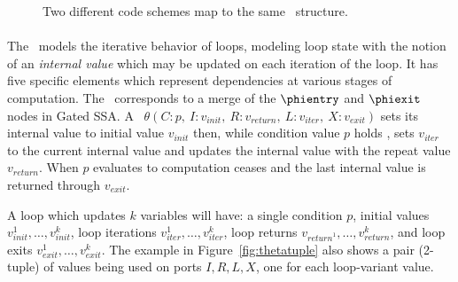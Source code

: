{\begin{figure}[!hb]
\centering
{}
\caption{Two different code schemes map to the same \Gn\ structure.}

\label{fig:twinPhis}
\end{figure}


\paragraph{\Tns}
The \Tn\ models the iterative behavior of loops, modeling loop state with the notion of an \emph{internal value} which may be updated on each iteration of the loop. 
It has five specific elements which represent dependencies at various stages of computation. 
The \Tn\ corresponds to a merge of the $\phientry$ and $\phiexit$ nodes in Gated SSA.
%
A \Tn\ $\theta(C:p,\ I:v_\textit{init},\ R:v_\textit{return},\ L: v_\textit{iter},\ X:v_{exit})$ sets its internal value to initial value $v_\textit{init}$ then, while condition value $p$ holds \true, sets $v_\textit{iter}$ to the current internal value and updates the internal value with the repeat value $v_\textit{return}$. 
When $p$ evaluates to \false computation ceases and the last internal value is returned through $v_\textit{exit}$.

%
A loop which updates $k$ variables will have: 
a single condition $p$, initial values $v_{\textit{init}}^1,\ldots,v_{\textit{init}}^k$, loop iterations $v_{\textit{iter}}^1,\ldots,v_{\textit{iter}}^k$, loop returns $v_{\textit{return}^1},\ldots,v_{\textit{return}}^k$, and loop exits $v_{\textit{exit}}^1,\ldots,v_{\textit{exit}}^k$.
The example in Figure~\ref{fig:thetatuple} also shows a pair (2-tuple) of values being used on ports $I,R,L,X$, one for each loop-variant value.

}
